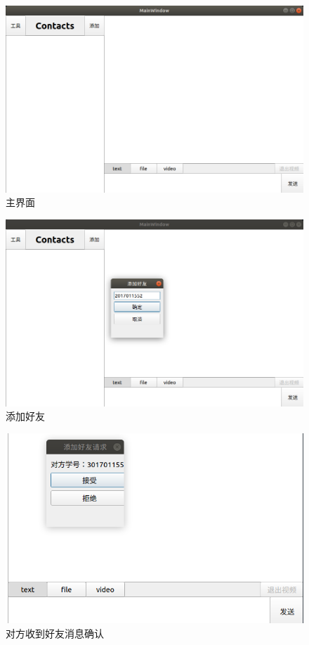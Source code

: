 \documentclass[UTF8]{ctexart}
\begin{document}
\begin{figure}[H]
    \centering
    \includegraphics[scale=0.3]{mainpanel.png}
    \caption{主界面}
\end{figure}

\begin{figure}[H]
    \centering
    \includegraphics[scale=0.3]{addfriend.png}
    \caption{添加好友}
\end{figure}
\begin{figure}[H]
    \centering
    \includegraphics[scale=0.4]{confirm.png}
    \caption{对方收到好友消息确认}
\end{figure}
\end{document}
